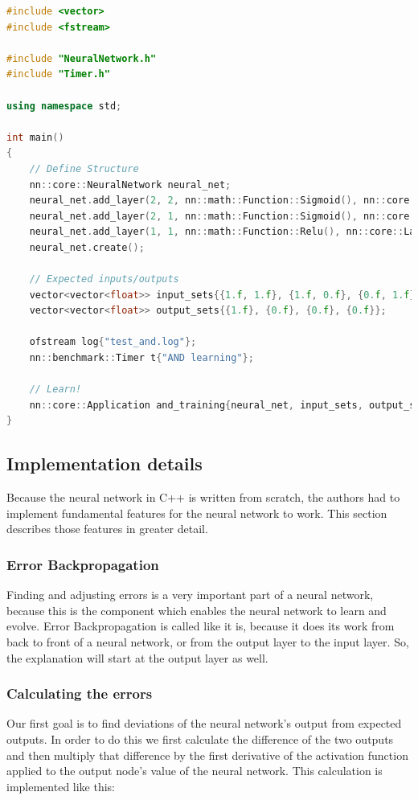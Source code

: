 \begin{lstlisting}[language=C++]
#include <vector>
#include <fstream>

#include "NeuralNetwork.h"
#include "Timer.h"

using namespace std;

int main()
{
	// Define Structure
	nn::core::NeuralNetwork neural_net;
	neural_net.add_layer(2, 2, nn::math::Function::Sigmoid(), nn::core::LayerType::Input);
	neural_net.add_layer(2, 1, nn::math::Function::Sigmoid(), nn::core::LayerType::Hidden);
	neural_net.add_layer(1, 1, nn::math::Function::Relu(), nn::core::LayerType::Output);
	neural_net.create();

	// Expected inputs/outputs
	vector<vector<float>> input_sets{{1.f, 1.f}, {1.f, 0.f}, {0.f, 1.f}, {0.f, 0.f}};
	vector<vector<float>> output_sets{{1.f}, {0.f}, {0.f}, {0.f}};

	ofstream log{"test_and.log"};
	nn::benchmark::Timer t{"AND learning"};

	// Learn!
	nn::core::Application and_training{neural_net, input_sets, output_sets, 500, 0.15, log};
}
\end{lstlisting}

\subsection{Implementation details}

Because the neural network in C++ is written from scratch, the authors had to implement fundamental features for the neural network to work. This section describes those features in greater detail.

\subsubsection{Error Backpropagation}
Finding and adjusting errors is a very important part of a neural network, because this is the component which enables the neural network to learn and evolve. Error Backpropagation is called like it is, because it does its work from back to front of a neural network, or from the output layer to the input layer. So, the explanation will start at the output layer as well.

\subsubsection{Calculating the errors}

Our first goal is to find deviations of the neural network's output from expected outputs. In order to do this we first calculate the difference of the two outputs and then multiply that difference by the first derivative of the activation function applied to the output node's value of the neural network. This calculation is implemented like this:

